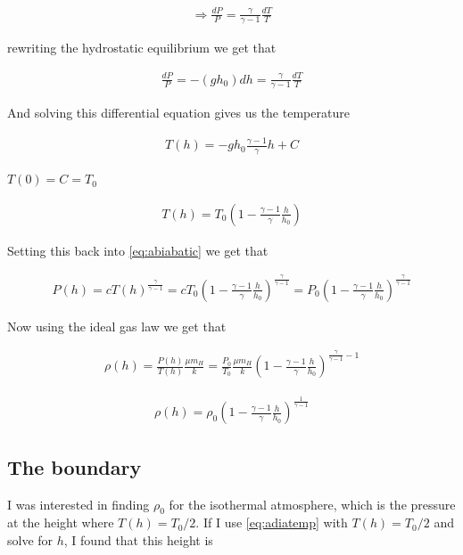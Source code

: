 \documentclass[a4paper, 10pt]{article}
\begin{document}
\begin{align}
\Rightarrow \frac{dP}{P} = \frac{\gamma}{\gamma - 1}\frac{dT}{T}
\end{align}

rewriting the hydrostatic equilibrium we get that

\begin{align}
\frac{dP}{P} = -(g h_0) dh = \frac{\gamma}{\gamma - 1}\frac{dT}{T}
\end{align}

And solving this differential equation gives us the temperature

\begin{align}
T(h) = -g h_0 \frac{\gamma-1}{\gamma}h + C
\end{align}

$T(0) = C = T_0$

\begin{align}\label{eq:adiatemp}
T(h) = T_0 \left( 1 -\frac{\gamma - 1}{\gamma} \frac{h}{h_0} \right)
\end{align}

Setting this back into \ref{eq:abiabatic} we get that

\begin{align}
P(h) = cT(h)^{\frac{\gamma}{\gamma-1}} = cT_0 \left( 1 -\frac{\gamma - 1}{\gamma} \frac{h}{h_0} \right)^{\frac{\gamma}{\gamma-1}} = P_0\left( 1 -\frac{\gamma - 1}{\gamma} \frac{h}{h_0} \right)^{\frac{\gamma}{\gamma-1}}
\end{align}

Now using the ideal gas law we get that

\begin{align}
\rho (h) = \frac{P(h)}{T(h)}\frac{\mu m_H}{k} = \frac{P_0}{T_0}\frac{\mu m_H}{k}\left( 1 -\frac{\gamma - 1}{\gamma} \frac{h}{h_0} \right)^{\frac{\gamma}{\gamma-1} - 1}
\end{align}

\begin{align}\label{eq:adiadens}
\rho (h) = \rho_0 \left(1-\frac{\gamma - 1}{\gamma} \frac{h}{h_0}\right)^{\frac{1}{\gamma - 1}}
\end{align}

\subsection{The boundary}
I was interested in finding $\rho_0$ for the isothermal atmosphere, which is the pressure at the height where $T(h) = T_0/2$. If I use \ref{eq:adiatemp} with  $T(h) = T_0/2$ and solve for $h$, I found that this height is
\end{document}
